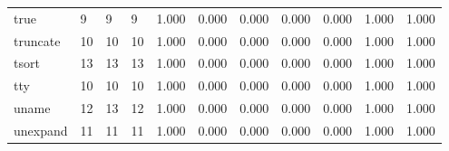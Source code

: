 \begin{longtable}{lp{1.8cm}p{1.8cm}p{1.8cm}p{1.8cm}p{1.8cm}p{1.8cm}p{1.8cm}p{1.8cm}p{1.8cm}p{1.8cm}}
true      &                            9 &                  9 &                                 9 &                                      1.000 &                                  0.000 &                                        0.000 &                             0.000 &                                   0.000 &                              1.000 &                                              1.000 \\
truncate  &                           10 &                 10 &                                10 &                                      1.000 &                                  0.000 &                                        0.000 &                             0.000 &                                   0.000 &                              1.000 &                                              1.000 \\
tsort     &                           13 &                 13 &                                13 &                                      1.000 &                                  0.000 &                                        0.000 &                             0.000 &                                   0.000 &                              1.000 &                                              1.000 \\
tty       &                           10 &                 10 &                                10 &                                      1.000 &                                  0.000 &                                        0.000 &                             0.000 &                                   0.000 &                              1.000 &                                              1.000 \\
uname     &                           12 &                 13 &                                12 &                                      1.000 &                                  0.000 &                                        0.000 &                             0.000 &                                   0.000 &                              1.000 &                                              1.000 \\
unexpand  &                           11 &                 11 &                                11 &                                      1.000 &                                  0.000 &                                        0.000 &                             0.000 &                                   0.000 &                              1.000 &                                              1.000 \\

\end{longtable}
